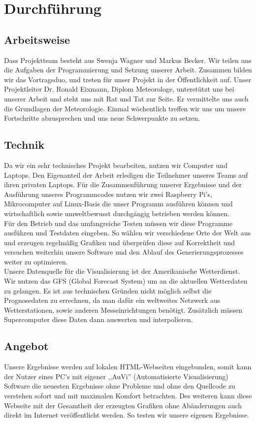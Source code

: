 \documentclass[a4paper,twoside,12pt,titlepage]{article}
\begin{document}
\section{Durchführung}
\subsection{Arbeitsweise}
Dass Projektteam besteht aus Swenja Wagner und Markus Becker. Wir teilen uns die Aufgaben der Programmierung und Setzung unserer Arbeit. Zusammen bilden wir das Vortragsduo, und treten für unser Projekt in der Öffentlichkeit auf. Unser Projektleiter Dr. Ronald Eixmann, Diplom Meteorologe, unterstützt uns bei unserer Arbeit und steht uns mit Rat und Tat zur Seite. Er vermittelte uns auch die Grundlagen der Meteorologie. Einmal wöchentlich treffen wir uns um unsere Fortschritte abzusprechen und uns neue Schwerpunkte zu setzen.
\subsection{Technik}
Da wir ein sehr technisches Projekt bearbeiten, nutzen wir Computer und Laptops. Den Eigenanteil der Arbeit erledigen die Teilnehmer unseres Teams auf ihren privaten Laptops. Für die Zusammenführung unserer Ergebnisse und der Ausführung unseres Programmcodes nutzen wir zwei Raspberry Pi's, Mikrocomputer auf Linux-Basis die unser Programm ausführen können und wirtschaftlich sowie umweltbewusst durchgängig betrieben werden können.\\
Für den Betrieb und das umfangreiche Testen müssen wir diese Programme ausführen und Testdaten eingeben. So wählen wir verschiedene Orte der Welt aus und erzeugen regelmäßig Grafiken und überprüfen diese auf Korrektheit und versuchen weiterhin unsere Software und den Ablauf des Generierungsprozesses weiter zu optimieren.\\
Unsere Datenquelle für die Visualisierung ist der Amerikanische Wetterdienst. Wir nutzen das GFS (Global Forecast System) um an die aktuellen Wetterdaten zu gelangen. Es ist aus technischen Gründen nicht möglich selbst die Prognosedaten zu errechnen, da man dafür ein weltweites Netzwerk aus Wetterstationen, sowie anderen Messeinrichtungen benötigt. Zusätzlich müssen Supercomputer diese Daten dann auswerten und interpolieren.
\subsection{Angebot}
Unsere Ergebnisse werden auf lokalen HTML-Webseiten eingebunden, somit kann der Nutzer eines PC's mit eigener ,,AuVi'' (Automatisierte Visualisierung) Software die neuesten Ergebnisse ohne Probleme und ohne den Quellcode zu verstehen sofort und mit maximalen Komfort betrachten. Des weiteren kann diese Webseite mit der Gesamtheit der erzeugten Grafiken ohne Abänderungen auch direkt im Internet veröffentlicht werden. So testen wir unsere eigenen Ergebnisse. 
\end{document}
